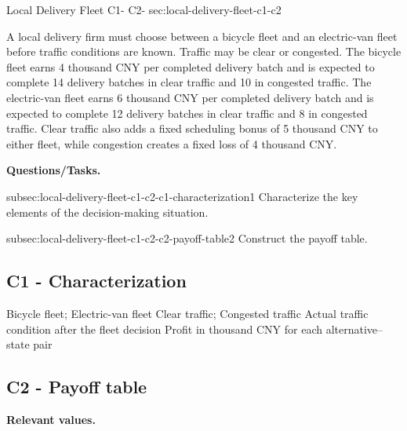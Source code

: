{		\vspace{-5mm}
		
	}
	
		\sectionScored
		{Local Delivery Fleet}
		{C1- \hspace{2mm} C2-}
		{sec:local-delivery-fleet-c1-c2}
		{
			A local delivery firm must choose between a bicycle fleet and an electric-van fleet before traffic conditions are known. Traffic may be clear or congested. The bicycle fleet earns 4 thousand CNY per completed delivery batch and is expected to complete 14 delivery batches in clear traffic and 10 in congested traffic. The electric-van fleet earns 6 thousand CNY per completed delivery batch and is expected to complete 12 delivery batches in clear traffic and 8 in congested traffic. Clear traffic also adds a fixed scheduling bonus of 5 thousand CNY to either fleet, while congestion creates a fixed loss of 4 thousand CNY.
			
			\textbf{Questions/Tasks.}
			\begin{enumerate}
				\CriterionTask
				{subsec:local-delivery-fleet-c1-c2-c1-characterization}{1}
				{Characterize the key elements of the decision-making situation. }
				
				\CriterionTask
				{subsec:local-delivery-fleet-c1-c2-c2-payoff-table}{2}
				{Construct the payoff table. }
			\end{enumerate}
			
			\label{subsec:local-delivery-fleet-c1-c2-c1-characterization}
			\subsection*{C1 - Characterization }
			
			\DecisionElementsTable
			{Bicycle fleet; Electric-van fleet}
			{Clear traffic; Congested traffic}
			{Actual traffic condition after the fleet decision}
			{Profit in thousand CNY for each alternative--state pair}
			
			\label{subsec:local-delivery-fleet-c1-c2-c2-payoff-table}
			\subsection*{C2 - Payoff table }
			
			\textbf{Relevant values.}
			
}
